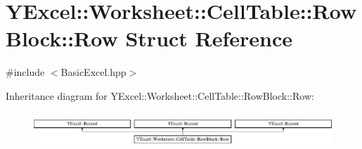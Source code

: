 \hypertarget{struct_y_excel_1_1_worksheet_1_1_cell_table_1_1_row_block_1_1_row}{}\section{Y\+Excel\+:\+:Worksheet\+:\+:Cell\+Table\+:\+:Row\+Block\+:\+:Row Struct Reference}
\label{struct_y_excel_1_1_worksheet_1_1_cell_table_1_1_row_block_1_1_row}


{\ttfamily \#include $<$Basic\+Excel.\+hpp$>$}

Inheritance diagram for Y\+Excel\+:\+:Worksheet\+:\+:Cell\+Table\+:\+:Row\+Block\+:\+:Row\+:\begin{figure}[H]
\begin{center}
\leavevmode
\includegraphics[height=1.357576cm]{struct_y_excel_1_1_worksheet_1_1_cell_table_1_1_row_block_1_1_row}
\end{center}
\end{figure}

